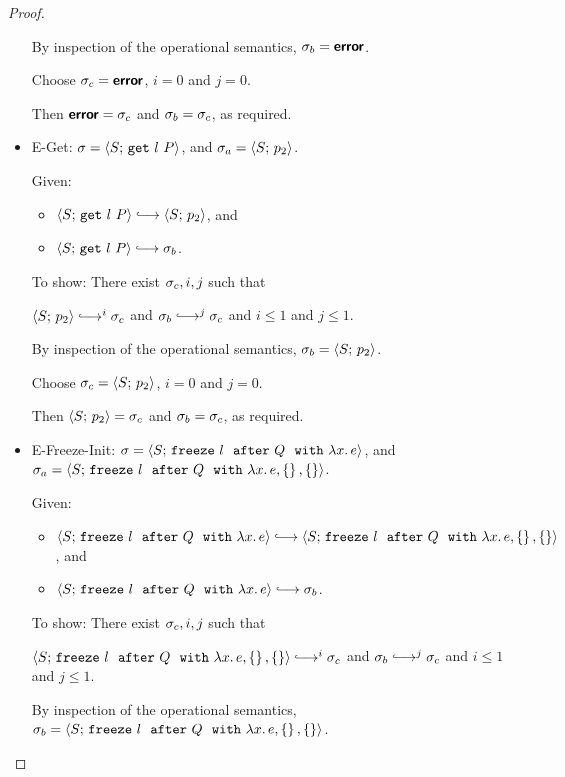 \begin{proof}
\begin{itemize}
      By inspection of the operational semantics, $\sigma_b = \textbf{\textsf{error}}$.

      Choose $\sigma_c = \textbf{\textsf{error}}$, $i = 0$ and $j = 0$.

      Then $\textbf{\textsf{error}} = \sigma_c$ and $\sigma_b = \sigma_c$, as required.

    \item {\sc E-Get}: $\sigma = \langle S;\, \mbox{\texttt{get}}~l~P \rangle$, and
      $\sigma_a = \langle S;\, p_2 \rangle$.

      Given:
      \begin{itemize}
      \item $\config{S}{\getexp{l}{P}} \parstepsto \config{S}{p_2}$,
        and
      \item $\config{S}{\getexp{l}{P}} \parstepsto \conf_b$.
      \end{itemize}

      To show: There exist $\sigma_c, i, j$ such that

      $\config{S}{p_2} \parstepsto^i \conf_c$ and $\conf_b
      \parstepsto^j \conf_c$ and $i \leq 1$ and $j \leq 1$.

      By inspection of the operational semantics, $\sigma_b =
      \langle S;\, p_2 \rangle$.

      Choose $\sigma_c = \langle S;\, p_2 \rangle$, $i = 0$ and $j = 0$.

      Then $\langle S;\, p_2 \rangle = \sigma_c$ and $\sigma_b = \sigma_c$, as
      required.

    \item {\sc E-Freeze-Init}: $\sigma =
      \langle S;\, \mbox{\texttt{freeze}}~l~~{\mbox{\texttt{after}}}~Q~~{\mbox{\texttt{with}}}~\lambda x.\,e \rangle$, and $\sigma_a =
      \langle S;\, \mbox{\texttt{freeze}}~l~~{\mbox{\texttt{after}}}~Q~~{\mbox{\texttt{with}}}~\lambda x.\,e, \left\{\right\}, \left\{\right\} \rangle$.

      Given:
      \begin{itemize}
      \item $\config{S}{\freezeafter{l}{Q}{\lam{x}{e}}} \parstepsto
        \config{S}{\freezeafterfull{l}{Q}{\lam{x}{e}}{\setof{}}{\setof{}}}$,
        and
      \item $\config{S}{\freezeafter{l}{Q}{\lam{x}{e}}} \parstepsto
        \conf_b$.
      \end{itemize}

      To show: There exist $\sigma_c, i, j$ such that

      $\config{S}{\freezeafterfull{l}{Q}{\lam{x}{e}}{\setof{}}{\setof{}}}
      \parstepsto^i \conf_c$ and $\conf_b \parstepsto^j \conf_c$ and
      $i \leq 1$ and $j \leq 1$.

      By inspection of the operational semantics, $\sigma_b =
      \langle S;\, \mbox{\texttt{freeze}}~l~~{\mbox{\texttt{after}}}~Q~~{\mbox{\texttt{with}}}~\lambda x.\,e, \left\{\right\}, \left\{\right\} \rangle$.


\end{itemize}
\end{proof}
